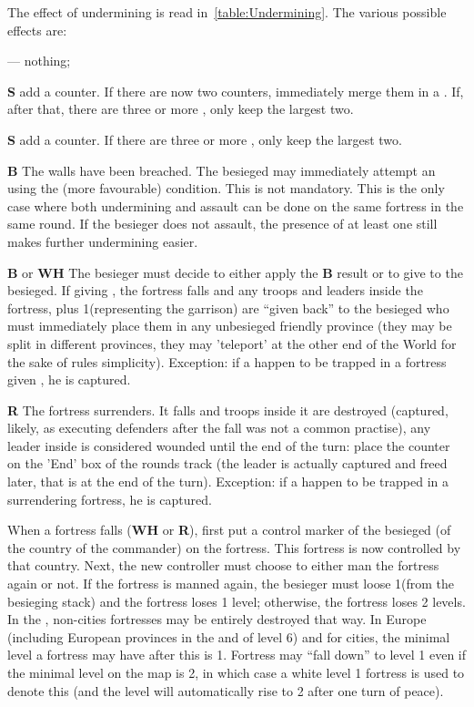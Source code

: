 The effect of undermining is read in~\ref{table:Undermining}. The various
possible effects are:
\begin{modlist}
\item[---] nothing;
\item[\textbf{S}\facemoins] add a \USURE\facemoins counter. If there are now
  two \USURE\facemoins counters, immediately merge them in a
  \USURE\faceplus. If, after that, there are three or more \USURE, only keep
  the largest two.
\item[\textbf{S}\faceplus] add a \USURE\faceplus counter. If there are three
  or more \USURE, only keep the largest two.
\item[\textbf{B}] The walls have been breached. The besieged may immediately
  attempt an  using the (more favourable) 
  condition. This  is not mandatory. This is the only case
  where both undermining and assault can be done on the same fortress in the
  same round. If the besieger does not assault, the presence of at least one
   still makes further undermining easier.
\item[\textbf{B} or \textbf{WH}] The besieger must decide to either apply the
  \textbf{B} result or to give  to the besieged. If giving
  , the fortress falls and any troops and leaders inside the
  fortress, plus 1\LD (representing the garrison) are ``given back'' to the
  besieged who must immediately place them in any unbesieged friendly province
  (they may be split in different provinces, they may 'teleport' at the other
  end of the World for the sake of rules simplicity). Exception: if a
   happen to be trapped in a fortress given ,
  he is captured.
\item[\textbf{R}] The fortress surrenders. It falls and troops inside it are
  destroyed (captured, likely, as executing defenders after the fall was not a
  common practise), any leader inside is considered wounded until the end of
  the turn: place the counter on the 'End' box of the rounds track (the leader
  is actually captured and freed later, that is at the end of the turn).
  Exception: if a  happen to be trapped in a surrendering
  fortress, he is captured.
\end{modlist}

When a fortress falls (\textbf{WH} or \textbf{R}), first put a control marker
of the besieged (of the country of the commander) on the fortress. This
fortress is now controlled by that country. Next, the new controller must
choose to either man the fortress again or not. If the fortress is manned
again, the besieger must loose 1\LD (from the besieging stack) and the
fortress loses 1 level; otherwise, the fortress loses 2 levels. In the \ROTW,
non-cities fortresses may be entirely destroyed that way. In Europe (including
European provinces in the \ROTW and \COL of level 6) and for \ROTW cities, the
minimal level a fortress may have after this is 1. Fortress may ``fall down''
to level 1 even if the minimal level on the map is 2, in which case a white
level 1 fortress is used to denote this (and the level will automatically rise
to 2 after one turn of peace).

